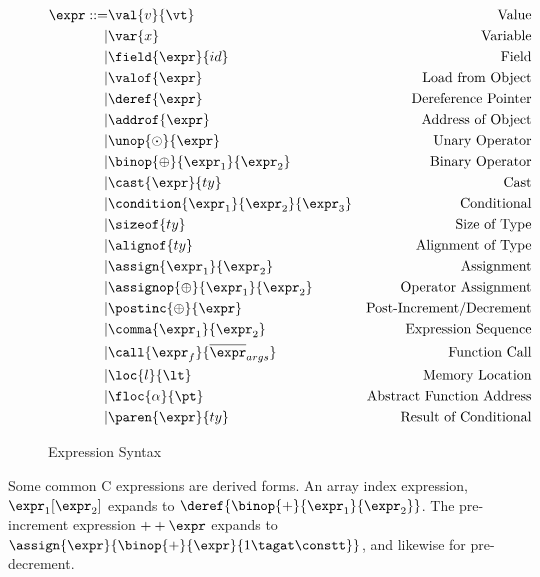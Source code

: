 \documentclass{article}
\begin{document}
\begin{figure}
  \[\begin{aligned}
  \expr ::= & \val{v}{\vt} & \textnormal{Value} \\
  | & \var{x} & \textnormal{Variable} \\
  | & \field{\expr}{id} & \textnormal{Field} \\
  | & \valof{\expr} & \textnormal{Load from Object} \\
  | & \deref{\expr} & \textnormal{Dereference Pointer} \\
  | & \addrof{\expr} & \textnormal{Address of Object} \\
  | & \unop{\odot}{\expr} & \textnormal{Unary Operator} \\
  | & \binop{\oplus}{\expr_1}{\expr_2} & \textnormal{Binary Operator} \\
  | & \cast{\expr}{ty} & \textnormal{Cast} \\
  | & \condition{\expr_1}{\expr_2}{\expr_3} & \textnormal{Conditional} \\
  | & \sizeof{ty} & \textnormal{Size of Type} \\
  | & \alignof{ty} & \textnormal{Alignment of Type} \\
  | & \assign{\expr_1}{\expr_2} & \textnormal{Assignment} \\
  | & \assignop{\oplus}{\expr_1}{\expr_2} & \textnormal{Operator Assignment} \\
  | & \postinc{\oplus}{\expr} & \textnormal{Post-Increment/Decrement} \\
  | & \comma{\expr_1}{\expr_2} & \textnormal{Expression Sequence} \\
  | & \call{\expr_f}{\overline{\expr}_{args}} & \textnormal{Function Call} \\
  | & \loc{l}{\lt} & \textnormal{Memory Location} \\
  | & \floc{\alpha}{\pt} & \textnormal{Abstract Function Address} \\
  | & \paren{\expr}{ty} & \textnormal{Result of Conditional} \\
  \end{aligned}\]
  \caption{Expression Syntax}
  \label{fig:expr}
\end{figure}

Some common C expressions are derived forms. An array index expression,
\(\expr_1[\expr_2]\) expands to \(\deref{\binop{+}{\expr_1}{\expr_2}}\).
The pre-increment  expression \(++\expr\) expands to
\(\assign{\expr}{\binop{+}{\expr}{1\tagat\constt}}\), and likewise for pre-decrement.
\end{document}
